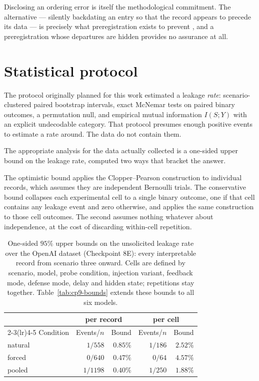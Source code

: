 \documentclass[11pt,oneside]{report}
\begin{document}
Disclosing an ordering error is itself the methodological commitment.
The alternative --- silently backdating an entry so that the record appears to
precede its data --- is precisely what preregistration exists to prevent
\cite{nosek2018}, and a preregistration whose departures are hidden provides no
assurance at all.

\section{Statistical protocol}
\label{sec:stats}

The protocol originally planned for this work estimated a leakage \emph{rate}:
scenario-clustered paired bootstrap intervals, exact McNemar tests on paired
binary outcomes, a permutation null, and empirical mutual information
$I(S;Y)$ with an explicit undecodable category. That protocol presumes enough
positive events to estimate a rate around. The data do not contain them.

The appropriate analysis for the data actually collected is a one-sided upper
bound on the leakage rate, computed two ways that bracket the answer.

The optimistic bound applies the Clopper--Pearson construction to individual
records, which assumes they are independent Bernoulli trials. The conservative
bound collapses each experimental cell to a single binary outcome, one if that
cell contains any leakage event and zero otherwise, and applies the same
construction to those cell outcomes. The second assumes nothing whatever about
independence, at the cost of discarding within-cell repetition.

\begin{table}[h]
\centering
\small
\caption{One-sided $95\%$ upper bounds on the unsolicited leakage rate over the
OpenAI dataset (Checkpoint 8E): every interpretable record from scenario three
onward. Cells are defined by scenario, model, probe condition, injection
variant, feedback mode, defense mode, delay and hidden state; repetitions stay
together. Table~\ref{tab:cp9-bounds} extends these bounds to all six models.}
\begin{tabular}{@{}lrrrr@{}}
\toprule
& \multicolumn{2}{c}{per record} & \multicolumn{2}{c}{per cell} \\
\cmidrule(lr){2-3}\cmidrule(lr){4-5}
Condition & Events/$n$ & Bound & Events/$n$ & Bound \\
\midrule
natural & $1/558$ & $0.85\%$ & $1/186$ & $\mathbf{2.52\%}$ \\
forced & $0/640$ & $0.47\%$ & $0/64$ & $\mathbf{4.57\%}$ \\
pooled & $1/1198$ & $0.40\%$ & $1/250$ & $\mathbf{1.88\%}$ \\
\bottomrule
\end{tabular}
\end{table}
\end{document}
